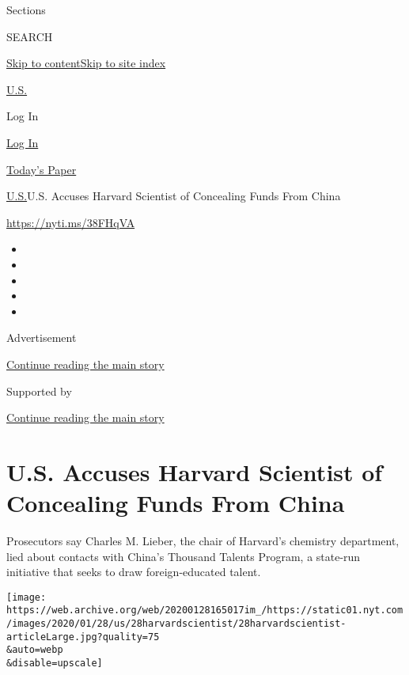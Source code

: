Sections

SEARCH

\protect\hyperlink{site-content}{Skip to
content}\protect\hyperlink{site-index}{Skip to site index}

\href{https://web.archive.org/web/20200128165017/https://www.nytimes.com/section/us}{U.S.}

Log In

\href{https://web.archive.org/web/20200128165017/https://myaccount.nytimes.com/auth/login?response_type=cookie\&client_id=vi}{Log
In}

\href{https://web.archive.org/web/20200128165017/https://www.nytimes.com/section/todayspaper}{Today's
Paper}

\href{/web/20200128165017/https://www.nytimes.com/section/us}{U.S.}\textbar{}U.S.
Accuses Harvard Scientist of Concealing Funds From China

\url{https://nyti.ms/38FHqVA}

\begin{itemize}
\item
\item
\item
\item
\item
\end{itemize}

Advertisement

\protect\hyperlink{after-top}{Continue reading the main story}

Supported by

\protect\hyperlink{after-sponsor}{Continue reading the main story}

\hypertarget{us-accuses-harvard-scientist-of-concealing-funds-from-china}{%
\section{U.S. Accuses Harvard Scientist of Concealing Funds From
China}\label{us-accuses-harvard-scientist-of-concealing-funds-from-china}}

Prosecutors say Charles M. Lieber, the chair of Harvard's chemistry
department, lied about contacts with China's Thousand Talents Program, a
state-run initiative that seeks to draw foreign-educated talent.

\texttt{[image: https://web.archive.org/web/20200128165017im\_/https://static01.nyt.com/images/2020/01/28/us/28harvardscientist/28harvardscientist-articleLarge.jpg?quality=75\\\&auto=webp\\\&disable=upscale]}


